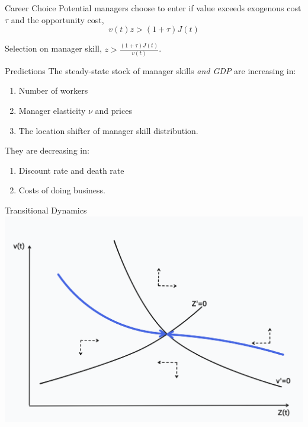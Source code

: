 \documentclass[
  ignorenonframetext,
  aspectratio=1610,
]{beamer}
\providecommand{\tightlist}{%
  \setlength{\itemsep}{0pt}\setlength{\parskip}{0pt}}
\begin{document}
\begin{frame}{Career Choice}
\protect\hypertarget{career-choice}{}
Potential managers choose to enter if value exceeds exogenous cost
\(\tau\) and the opportunity cost, \[v(t)z > (1+\tau)J(t)\]

Selection on manager skill, \(z > \frac {(1+\tau)J(t)} {v(t)}\).
\end{frame}

\begin{frame}{Predictions}
\protect\hypertarget{predictions}{}
The steady-state stock of manager skills \emph{and GDP} are increasing
in:

\begin{enumerate}
\tightlist
\item
  Number of workers
\item
  Manager elasticity \(\nu\) and prices
\item
  The location shifter of manager skill distribution.
\end{enumerate}

They are decreasing in:

\begin{enumerate}
\tightlist
\item
  Discount rate and death rate
\item
  Costs of doing business.
\end{enumerate}
\end{frame}

\begin{frame}{Transitional Dynamics}
\protect\hypertarget{transitional-dynamics}{}
\includegraphics{fig/phase1.png}
\end{frame}
\end{document}

